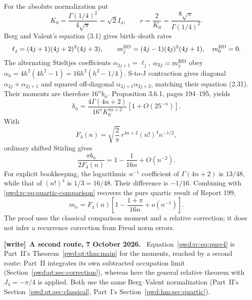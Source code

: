 \documentclass[11pt,letterpaper]{article}
\numberwithin{equation}{section}
\theoremstyle{remark}\newtheorem{remark}[theorem]{Remark}
\newenvironment{writenote}[1][]{\par\smallskip\begingroup\small
 \noindent\textbf{[write]}\if\relax\detokenize{#1}\relax\else~\textbf{#1.}\fi\ }%
 {\par\endgroup\smallskip}
\begin{document}
For the absolute normalization put
\[
 K_0=\frac{\Gamma(1/4)^2}{4\sqrt\pi}=\sqrt2 I_4,
 \qquad r=\frac2{K_0}=\frac{8\sqrt\pi}{\Gamma(1/4)^2}.
\]
Berg and Valent's equation (3.1) gives birth--death rates
\[
 \ell_j=(4j+1)(4j+2)^2(4j+3),\qquad
 m_j^{\rm BD}=(4j-1)(4j)^2(4j+1),\quad m_0^{\rm BD}=0.
\]
The alternating Stieltjes coefficients $\alpha_{2j+1}=\ell_j$, $\alpha_{2j}=m_j^{\rm BD}$ obey
$\alpha_h=4h^2(4h^2-1)=16h^2(h^2-1/4)$. S-to-J contraction gives diagonal $\alpha_{2j}+\alpha_{2j+1}$ and squared off-diagonal $\alpha_{2j+1}\alpha_{2j+2}$, matching their equation (2.31). Their moments are therefore $16^nb_n$. Proposition 3.6.1, pages 194--195, yields \cite{bergvalent}
\begin{equation}\label{pwd:rc:eq:BV}
 b_n=\frac{4\Gamma(4n+2)}{16^nK_0^{4n+2}}
 \left[1+O(25^{-n})\right].
\end{equation}
With
\begin{equation}\label{pwd:rc:eq:F4}
 F_4(n)=\sqrt{\frac2\pi}\,r^{4n+2}(n!)^4n^{-1/2},
\end{equation}
ordinary shifted Stirling gives
\[
 \frac{\pi b_n}{2F_4(n)}=1-\frac1{16n}+O(n^{-2}).
\]
For explicit bookkeeping, the logarithmic $n^{-1}$ coefficient of $\Gamma(4n+2)$ is $13/48$, while that of $(n!)^4$ is $1/3=16/48$. Their difference is $-1/16$. Combining with \eqref{pwd:rc:eq:quartic-comparison} recovers the pure quartic result of Report 199,
\begin{equation}\label{pwd:rc:eq:pure4}
 m_n=F_4(n)\left[1-\frac{1+\pi}{16n}+o(n^{-1})\right].
\end{equation}
The proof uses the classical comparison moment and a relative correction; it does not infer a recurrence correction from Freud norm errors.
\begin{writenote}[A second route, 7 October 2026]
Equation~\eqref{pwd:rc:eq:pure4} is Part~II's Theorem~\ref{pwd:qt:thm:main}
for the moments, reached by a second route: Part~II integrates its own
subtracted occupation limit (Section~\ref{pwd:qt:sec:correction}), whereas
here the general relative theorem with $J_4=-\pi/4$ is applied. Both use the
same Berg--Valent normalization (Part~II's Section~\ref{pwd:qt:sec:classical},
Part~I's Section~\ref{pwd:hm:sec:quartic}).
\end{writenote}
\end{document}
